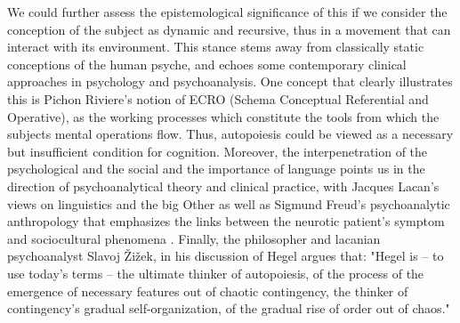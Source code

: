 \documentclass[fleqn,10pt]{wlscirep}
\begin{document}
We could further assess the epistemological significance of this if we consider the conception of the subject as dynamic and recursive, thus in a movement that can interact with its environment. This stance stems away from classically static conceptions of the human psyche, and echoes some contemporary clinical approaches in psychology and psychoanalysis. One concept that clearly illustrates this is Pichon Riviere’s  notion of ECRO (Schema Conceptual Referential and Operative), as the working processes which constitute the tools from which the subjects mental operations flow\cite{pichon_riviere_processus_2004}. Thus, autopoiesis could be viewed as a necessary but insufficient condition for cognition\cite{bitbol_autopoiesis_2004}. Moreover, the interpenetration of the psychological and the social and the importance of language points us in the direction of psychoanalytical theory and clinical practice, with Jacques Lacan’s views on linguistics and the big Other as well as Sigmund Freud’s psychoanalytic anthropology that emphasizes the links between the neurotic patient’s symptom and sociocultural phenomena \cite{freud_totem_1989}. Finally, the philosopher and lacanian psychoanalyst Slavoj Žižek, in his discussion of Hegel argues that: "Hegel is – to use today's terms – the ultimate thinker of autopoiesis, of the process of the emergence of necessary features out of chaotic contingency, the thinker of contingency's gradual self-organization, of the gradual rise of order out of chaos."\cite{zizek_less_2013}










\end{document}
